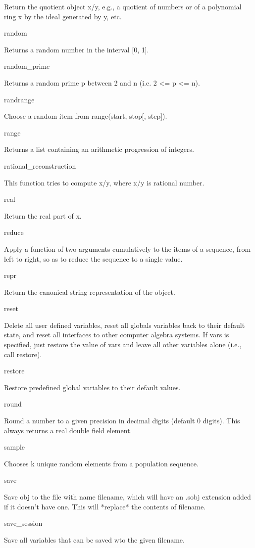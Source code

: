 \documentclass[12pt,oneside]{book}
\begin{document}
Return the quotient object x/y, e.g., a quotient of numbers or of a polynomial ring x by the ideal generated by y, etc.

random

Returns a random number in the interval [0, 1].

random\_prime

Returns a random prime p between 2 and n (i.e. 2 {\textless}= p
{\textless}= n).

randrange

Choose a random item from range(start, stop[, step]).

range

Returns a list containing an arithmetic progression of integers.

rational\_reconstruction

This function tries to compute x/y, where x/y is rational number.

real

Return the real part of x.

reduce

Apply a function of two arguments cumulatively to the items of a sequence, from left to right, so as to reduce the sequence to a single value.

repr

Return the canonical string representation of the object.

reset

Delete all user defined variables, reset all globals variables back to their default state, and reset all interfaces to other computer algebra systems. If vars is specified, just restore the value of vars and leave all other variables alone (i.e., call restore).

restore

Restore predefined global variables to their default values.

round

Round a number to a given precision in decimal digits (default 0 digits). This always returns a real double field element.

sample

Chooses k unique random elements from a population sequence.

save

Save obj to the file with name filename, which will have an .sobj extension added if it doesn't have one. This will *replace* the contents of filename.

save\_session

Save all variables that can be saved wto the given filename.
\end{document}
